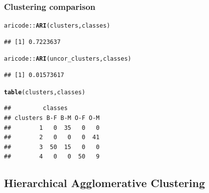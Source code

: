 \documentclass{beamer}\usepackage[]{graphicx}\usepackage[]{color}
\makeatletter
\newcommand{\hlopt}[1]{\textcolor[rgb]{0,0,0}{#1}}%
\newcommand{\hlstd}[1]{\textcolor[rgb]{0.345,0.345,0.345}{#1}}%
\newcommand{\hlkwd}[1]{\textcolor[rgb]{0.737,0.353,0.396}{\textbf{#1}}}%
\newenvironment{kframe}{%
 \def\at@end@of@kframe{}%
 \ifinner\ifhmode%
  \def\at@end@of@kframe{\end{minipage}}%
  \begin{minipage}{\columnwidth}%
 \fi\fi%
 \def\FrameCommand##1{\hskip\@totalleftmargin \hskip-\fboxsep
 \colorbox{shadecolor}{##1}\hskip-\fboxsep
     \hskip-\linewidth \hskip-\@totalleftmargin \hskip\columnwidth}%
 \MakeFramed {\advance\hsize-\width
   \@totalleftmargin\z@ \linewidth\hsize
   \@setminipage}}%
 {\par\unskip\endMakeFramed%
 \at@end@of@kframe}
\newenvironment{knitrout}{}{} %
\makeatother
\begin{document}
% 

\begin{frame}[fragile]
  \frametitle{Clustering comparison}

\begin{knitrout}\scriptsize
{}\color{fgcolor}\begin{kframe}
\begin{alltt}
\hlstd{aricode}\hlopt{::}\hlkwd{ARI}\hlstd{(clusters, classes)}
\end{alltt}
\begin{verbatim}
## [1] 0.7223637
\end{verbatim}
\begin{alltt}
\hlstd{aricode}\hlopt{::}\hlkwd{ARI}\hlstd{(uncor_clusters, classes)}
\end{alltt}
\begin{verbatim}
## [1] 0.01573617
\end{verbatim}
\begin{alltt}
\hlkwd{table}\hlstd{(clusters, classes)}
\end{alltt}
\begin{verbatim}
##         classes
## clusters B-F B-M O-F O-M
##        1   0  35   0   0
##        2   0   0   0  41
##        3  50  15   0   0
##        4   0   0  50   9
\end{verbatim}
\end{kframe}
\end{knitrout}

\end{frame}

\subsection{Hierarchical Agglomerative Clustering}
\end{document}
